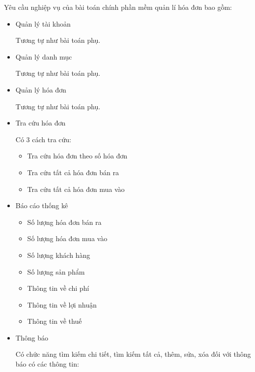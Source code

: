 Yêu cầu nghiệp vụ của bài toán chính phần mềm quản lí hóa đơn bao gồm:

\begin{itemize}

\item Quản lý tài khoản

Tương tự như bài toán phụ.

\item Quản lý danh mục

Tương tự như bài toán phụ.

\item Quản lý hóa đơn

Tương tự như bài toán phụ.

\item Tra cứu hóa đơn

Có 3 cách tra cứu:

\begin{itemize}

\item Tra cứu hóa đơn theo số hóa đơn

\item Tra cứu tất cả hóa đơn bán ra

\item Tra cứu tất cả hóa đơn mua vào

\end{itemize}

\item Báo cáo thống kê

\begin{itemize}

\item Số lượng hóa đơn bán ra

\item Số lượng hóa đơn mua vào

\item Số lượng khách hàng

\item Số lượng sản phẩm

\item Thông tin về chi phí

\item Thông tin về lợi nhuận

\item Thông tin về thuế

\end{itemize}

\item Thông báo

Có chức năng tìm kiếm chi tiết, tìm kiếm tất cả, thêm, sửa, xóa đối với thông báo có các thông tin:


\end{itemize}
